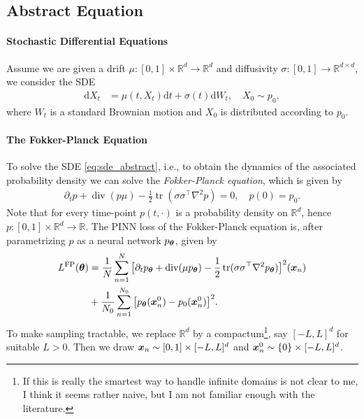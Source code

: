 \subsection{Abstract Equation}
\paragraph{Stochastic Differential Equations}
Assume we are given a drift $\mu:[0,1]\times \mathbb R^d\to\mathbb R^d$ and diffusivity $\sigma:[0,1] \to \mathbb R^{d\times d}$, we consider the SDE
\begin{align}\label{eq:sde_abstract}
    \mathrm dX_t
    &=
    \mu(t, X_t)\mathrm d t
    +
    \sigma(t) \mathrm d W_t,
    \quad 
    X_0 \sim p_0,
\end{align}
where $W_t$ is a standard Brownian motion and $X_0$ is distributed according to $p_0$. 

\paragraph{The Fokker-Planck Equation}
To solve the SDE \eqref{eq:sde_abstract}, i.e., to obtain the dynamics of the associated probability density we can solve the \emph{Fokker-Planck equation}, which is given by
\begin{align}\label{eq:fokker_planck_abstract}
    \partial_t p
    +
    \operatorname{div}(p\mu)
    -
    \frac12 \operatorname{tr}(\sigma \sigma^\top\nabla^2 p)
    =
    0,
    \quad
    p(0) = p_0.
\end{align}
Note that for every time-point $p(t,\cdot)$ is a probability density on $\mathbb R^d$, hence $p:[0,1]\times\mathbb R^d \to \mathbb R$. The PINN loss of the Fokker-Planck equation is, after parametrizing $p$ as a neural network $p_{{\bm{\theta}}}$, given by
\begin{align*}
    L^{\textrm{FP}}({\bm{\theta}})
    &=
    \frac{1}{N}
    \sum_{n=1}^{N}
    \big[
    \partial_t p_{{\bm{\theta}}}
    +
    \operatorname{div}(\mu p_{{\bm{\theta}}})
    -
    \frac12 \operatorname{tr}(\sigma\sigma^\top\nabla^2 p_{{\bm{\theta}}})
    \big]^2
    ({\bm{x}}_n)
    \\
    &+
    \frac{1}{N_0}
    \sum_{n=1}^{N_0}
    \big[
    p_{{\bm{\theta}}}({\bm{x}}_n^0) - p_0({\bm{x}}_n^0)
    \big]^2.
\end{align*}
To make sampling tractable, we replace $\mathbb R^d$ by a compactum\footnote{If this is really the smartest way to handle infinite domains is not clear to me, I think it seems rather naive, but I am not familiar enough with the literature.}, say $[-L, L]^d$ for suitable $L>0$. Then we draw ${\bm{x}}_n \sim [0, 1] \times [-L, L]^d$ and ${\bm{x}}_n^0 \sim \{0\} \times [-L, L]^d$.

